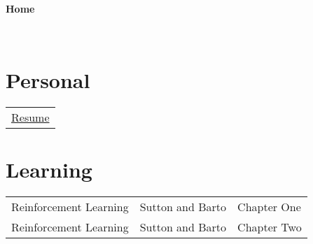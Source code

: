 \documentclass[11pt]{article}
\begin{document}
~
~

\begin{center}
  {
	\fontsize{1.5cm}{1.5cm}
        \textcolor{CalPolyGreen}{\textbf{Home}}
  }

\end{center}

~
~


\section*{\textcolor{CalPolyGreen}{Personal}}
\begin{tabular}{l}
	\href{file:///Users/conorcarroll/Documents/lilcpuppy.github.io/resume.html}{Resume}
\end{tabular}

\section*{\textcolor{CalPolyGreen}{Learning}}
\begin{tabular}{lll}
	Reinforcement Learning	& Sutton and Barto  & Chapter One   \\
	Reinforcement Learning	& Sutton and Barto  & Chapter Two   \\
\end{tabular}
\end{document}
